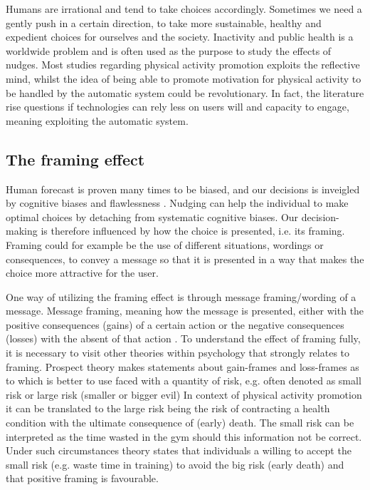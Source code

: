 Humans are irrational and tend to take choices accordingly. Sometimes we need a gently push in a certain direction, to take more sustainable, healthy and expedient choices for ourselves and the society. Inactivity and public health is a worldwide problem  and  is  often  used  as  the  purpose  to  study  the  effects  of  nudges.  Most  studies regarding physical activity promotion exploits the reflective mind, whilst the idea of being able to promote motivation for physical activity to be handled by the automatic system could be revolutionary. In fact, the literature rise questions if technologies can rely less on users will and capacity to engage, meaning exploiting the automatic system.  

\subsection{The framing effect}
Human forecast is proven many times to be biased, and our decisions is inveigled by cognitive biases and flawlessness  \cite{thaler_nudge-_2009}.
Nudging can help the individual to make optimal choices by detaching from systematic cognitive biases.
Our decision-making is therefore influenced by how the choice is presented, i.e. its framing. Framing could for example be the use of different situations, wordings or consequences, to convey a message so that it is presented in a way that makes the choice more attractive for the user. 

One way of utilizing the framing effect is through message framing/wording of a message. Message framing, meaning how the message is presented, either with the positive consequences (gains) of a certain action or the negative consequences (losses) with the absent of that action \cite{rothman_shaping_1997}.
To understand the effect of framing fully, it is necessary to visit other theories within psychology that strongly relates to framing. Prospect theory makes statements about gain-frames and loss-frames as to which is better to use faced with a quantity of risk, e.g. often denoted as small risk or large risk (smaller or bigger evil)
In context of physical activity promotion it can be translated to the large risk being the risk of contracting a health condition with the ultimate consequence of (early) death. The small risk can be interpreted as the time wasted in the gym should this information not be correct. Under such circumstances theory states that individuals a willing to accept the small risk (e.g. waste time in training) to avoid the big risk (early death) and that positive framing is favourable. 

